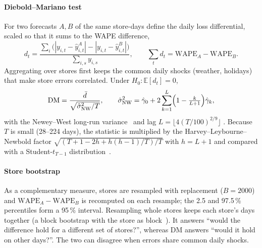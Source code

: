 \documentclass[conference]{IEEEtran}
\begin{document}
\paragraph*{Diebold--Mariano test} For two forecasts $A,B$ of the same store-days define the daily
loss differential, scaled so that it sums to the WAPE difference,
\begin{equation}
  d_t = \frac{\sum_i \bigl(|y_{i,t}-\hat y^A_{i,t}| - |y_{i,t}-\hat y^B_{i,t}|\bigr)}
             {\sum_{i,s} y_{i,s}},\qquad \sum_t d_t = \mathrm{WAPE}_A - \mathrm{WAPE}_B .
\end{equation}
Aggregating over stores first keeps the common daily shocks (weather, holidays) that make store
errors correlated. Under $H_0: \mathbb{E}[d_t]=0$,
\begin{equation}
  \mathrm{DM} = \frac{\bar d}{\sqrt{\hat\sigma^2_{\mathrm{NW}}/T}},\qquad
  \hat\sigma^2_{\mathrm{NW}} = \hat\gamma_0 + 2\sum_{k=1}^{L}\Bigl(1-\tfrac{k}{L+1}\Bigr)\hat\gamma_k ,
\end{equation}
with the Newey--West long-run variance~\cite{newey1987hac} and lag $L=\lfloor 4(T/100)^{2/9}\rfloor$
\cite{diebold1995comparing}. Because $T$ is small (28--224 days), the statistic is multiplied by the
Harvey--Leybourne--Newbold factor $\sqrt{(T+1-2h+h(h-1)/T)/T}$ with $h=L+1$ and compared with a
Student-$t_{T-1}$ distribution~\cite{harvey1997testing}.

\paragraph*{Store bootstrap} As a complementary measure, stores are resampled with replacement
($B=2000$) and $\mathrm{WAPE}_A-\mathrm{WAPE}_B$ is recomputed on each resample; the 2.5 and 97.5\,\%
percentiles form a 95\,\% interval. Resampling whole stores keeps each store's days together (a
block bootstrap with the store as block~\cite{kunsch1989jackknife}). It answers ``would the difference
hold for a different set of stores?'', whereas DM answers ``would it hold on other days?''. The two can
disagree when errors share common daily shocks.
\end{document}
